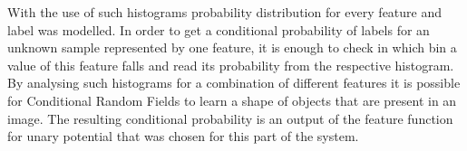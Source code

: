 With the use of such histograms probability distribution for every feature and label was modelled. In order to get a conditional probability of labels for an unknown sample represented by one feature, it is enough to check in which bin a value of this feature falls and read its probability from the respective histogram. By analysing such histograms for a combination of different features it is possible for Conditional Random Fields to learn a shape of objects that are present in an image. The resulting conditional probability is an output of the feature function for unary potential that was chosen for this part of the system.